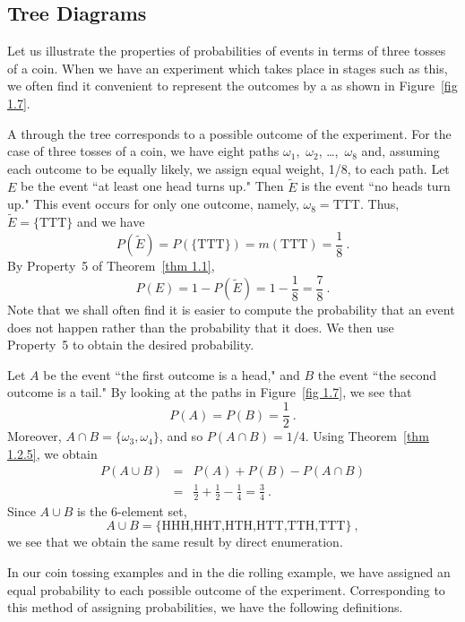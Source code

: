 \subsection*{Tree Diagrams}

\begin{example}\label{exam 1.8}
Let us illustrate the properties of probabilities of events in terms of three
tosses of a coin.  When we have an experiment which takes place in stages
such
as this, we often find it convenient to represent the outcomes by a  as shown in Figure~\ref {fig 1.7}.


A  through the tree corresponds to a possible outcome of the
experiment.  For the case of three tosses of a coin, we have eight paths
$\omega_1$,~$\omega_2$, \dots,~$\omega_8$ and, assuming each outcome to be
equally likely, we assign equal weight, 1/8, to each path.  Let $E$ be the
event
``at least one head turns up."  Then $\tilde E$ is the event ``no heads turn
up."  This event occurs for only one outcome, namely, $\omega_8 = \mbox{TTT}$. 
Thus, $\tilde E = \{\mbox{TTT}\}$ and we have
$$
P(\tilde E) = P(\{\mbox{TTT}\}) = m(\mbox{TTT}) = \frac18\ .
$$
By Property~5 of Theorem~\ref{thm 1.1},
$$
P(E) = 1 - P(\tilde E) = 1 - \frac18 = \frac78\ .
$$
Note that we shall often find it is easier to compute the probability that an
event does not happen rather than the probability that it does.  We then use
Property~5 to obtain the desired probability.

Let $A$ be the event ``the first outcome is a head," and $B$ the event ``the
second outcome is a tail."  By looking at the paths in Figure~\ref{fig 1.7},
we see that
$$
P(A) = P(B) = \frac12\ .
$$
Moreover, $A \cap B = \{\omega_3,\omega_4\}$, and so $P(A \cap B) = 1/4.$ 
Using Theorem~\ref{thm 1.2.5}, we obtain
\begin{eqnarray*}
P(A \cup B) & = & P(A) + P(B) - P(A \cap B) \\
& = & \frac 12 + \frac 12 - \frac 14 = \frac 34\ .
\end{eqnarray*}
Since $A \cup B$ is the 6-element set,
$$
A \cup B = \{\mbox{HHH,HHT,HTH,HTT,TTH,TTT}\}\ ,
$$
we see that we obtain the same result by direct enumeration.
\end{example}
\par
In our coin tossing examples and in the die rolling example, we have assigned
an equal probability to each possible outcome of the experiment. 
Corresponding
to this method of assigning probabilities, we have the following definitions.

